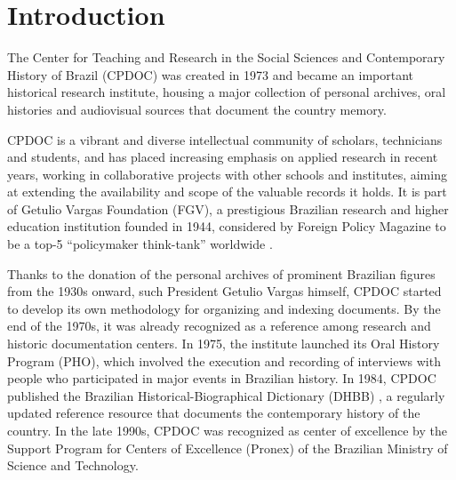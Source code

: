 \section{Introduction}\label{sec:intro}

%

The Center for Teaching and Research in the Social Sciences and
Contemporary History of Brazil (CPDOC) was created in 1973 and became
an important historical research institute, housing a major collection
of personal archives, oral histories and audiovisual sources that
document the country memory. 

CPDOC is a vibrant and diverse intellectual community of scholars,
technicians and students, and has placed increasing emphasis on
applied research in recent years, working in collaborative projects
with other schools and institutes, aiming at extending the availability
and scope of the valuable records it holds. It is part of Getulio Vargas Foundation
(FGV), a prestigious Brazilian research and higher education
institution founded in 1944, considered by Foreign Policy Magazine to
be a top-5 ``policymaker think-tank'' worldwide \cite{think-tank}.

Thanks to the donation of the personal archives of prominent Brazilian figures from the
1930s onward, such President Getulio
Vargas himself, CPDOC started to develop its own methodology for
organizing and indexing documents. By the end of the 1970s, it was
already recognized as a reference among research and historic
documentation centers. In 1975, the institute launched its Oral
History Program (PHO), which involved the execution and recording of
interviews with people who participated in major events in Brazilian
history. In 1984, CPDOC published the Brazilian
Historical-Biographical Dictionary (DHBB) \cite{dhbb}, a regularly
updated reference resource that documents the contemporary history of
the country. In the late 1990s, CPDOC was recognized as center of
excellence by the Support Program for Centers of Excellence (Pronex)
of the Brazilian Ministry of Science and Technology.

